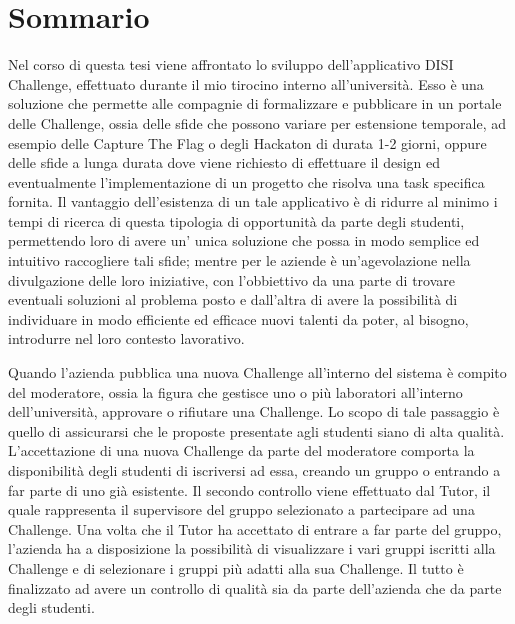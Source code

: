 \chapter*{Sommario} %
\label{sommario}






Nel corso di questa tesi viene affrontato lo sviluppo dell'applicativo DISI Challenge, effettuato durante il mio tirocino interno all'università. Esso è una soluzione che permette alle compagnie di formalizzare e pubblicare in un portale delle Challenge, ossia delle sfide che possono variare per estensione temporale, ad esempio delle Capture The Flag o degli Hackaton di durata 1-2 giorni, oppure delle sfide a lunga durata dove viene richiesto di effettuare il design ed eventualmente l'implementazione di un progetto che risolva una task specifica fornita. Il vantaggio dell'esistenza di un tale applicativo è di ridurre al minimo i tempi di ricerca di questa tipologia di opportunità da parte degli studenti, permettendo loro di avere un' unica soluzione che possa in modo semplice ed intuitivo raccogliere tali sfide; mentre per le aziende è un'agevolazione nella divulgazione delle loro iniziative, con l'obbiettivo da una parte di trovare eventuali soluzioni al problema posto e dall'altra di avere la possibilità di individuare in modo efficiente ed efficace nuovi talenti da poter, al bisogno, introdurre nel loro contesto lavorativo.

Quando l'azienda pubblica una nuova Challenge all'interno del sistema è compito del moderatore, ossia la figura che gestisce uno o più laboratori all'interno dell'università, approvare o rifiutare una Challenge. Lo scopo di tale passaggio è quello di assicurarsi che le proposte presentate agli studenti siano di alta qualità. L'accettazione di una nuova Challenge da parte del moderatore comporta la disponibilità degli studenti di iscriversi ad essa, creando un gruppo o entrando a far parte di uno già esistente. Il secondo controllo viene effettuato dal Tutor, il quale rappresenta il supervisore del gruppo selezionato a partecipare ad una Challenge. Una volta che il Tutor ha accettato di entrare a far parte del gruppo, l'azienda ha a disposizione la possibilità di visualizzare i vari gruppi iscritti alla Challenge e di selezionare i gruppi più adatti alla sua Challenge. Il tutto è finalizzato ad avere un controllo di qualità sia da parte dell'azienda che da parte degli studenti. 


